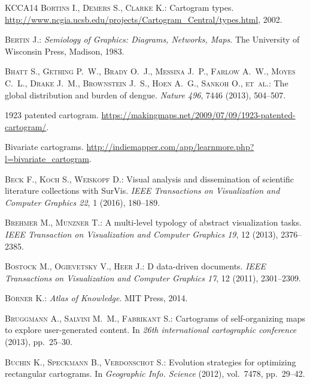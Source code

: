\documentclass{egpubl}
\begin{document}
\begin{thebibliography}{\uppercase{KCCA{\etalchar{*}}14}}
\textsc{Bortins I., Demers S., Clarke K.}:
\newblock Cartogram types.
\newblock
  \url{http://www.ncgia.ucsb.edu/projects/Cartogram_Central/types.html}, 2002.

\textsc{Bertin J.}:
\newblock \emph{Semiology of Graphics: Diagrams, Networks, Maps}.
\newblock The University of Wisconsin Press, Madison, 1983.

\textsc{Bhatt S., Gething P.~W., Brady O.~J., Messina J.~P., Farlow A.~W.,
  Moyes C.~L., Drake J.~M., Brownstein J.~S., Hoen A.~G., Sankoh O., et~al.}:
\newblock The global distribution and burden of dengue.
\newblock \emph{Nature 496}, 7446 (2013), 504--507.

1923 patented cartogram.
\newblock \url{https://makingmaps.net/2009/07/09/1923-patented-cartogram/}.

Bivariate cartograms.
\newblock \url{http://indiemapper.com/app/learnmore.php?l=bivariate_cartogram}.

\textsc{Beck F., Koch S., Weiskopf D.}:
\newblock Visual analysis and dissemination of scientific literature
  collections with {S}ur{V}is.
\newblock \emph{IEEE Transactions on Visualization and Computer Graphics 22}, 1
  (2016), 180--189.

\textsc{Brehmer M., Munzner T.}:
\newblock A multi-level typology of abstract visualization tasks.
\newblock \emph{{IEEE} Transaction on Visualization and Computer Graphics 19},
  12 (2013), 2376--2385.

\textsc{Bostock M., Ogievetsky V., Heer J.}:
\newblock D data-driven documents.
\newblock \emph{IEEE Transactions on Visualization and Computer Graphics 17},
  12 (2011), 2301--2309.

\textsc{B{\"o}rner K.}:
\newblock \emph{Atlas of Knowledge}.
\newblock MIT Press, 2014.

\textsc{Bruggmann A., Salvini M.~M., Fabrikant S.}:
\newblock Cartograms of self-organizing maps to explore user-generated content.
\newblock In \emph{26th international cartographic conference} (2013),
  pp.~25--30.

\textsc{Buchin K., Speckmann B., Verdonschot S.}:
\newblock Evolution strategies for optimizing rectangular cartograms.
\newblock In \emph{Geographic Info. Science} (2012), vol.~7478, pp.~29--42.


\end{thebibliography}
\end{document}
